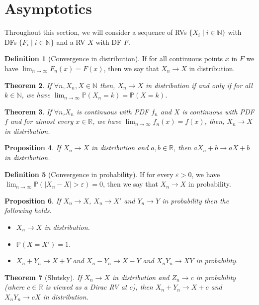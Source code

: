 \documentclass[paper=a4, fontsize=12pt]{scrartcl} %
\newtheorem{thm}{Theorem}[section]
\newtheorem{prop}[thm]{Proposition}
\theoremstyle{definition}
\newtheorem{defn}[thm]{Definition}
\theoremstyle{remark}
\newcommand{\R}{\mathbb{R}}
\newcommand{\N}{\mathbb{N}}
\renewcommand{\P}{\mathbb{P}}
\numberwithin{equation}{section} %
\numberwithin{figure}{section} %
\numberwithin{table}{section} %
\begin{document}
\section{Asymptotics}
Throughout this section, we will consider a sequence of RVs $\{X_i \mid i \in \N\}$ with DFs $\{F_i \mid i \in \N\}$ and a RV $X$ with DF $F$.
\begin{defn}[Convergence in distribution]
	If for all continuous points $x$ in $F$ we have $\lim_{n\rightarrow \infty} F_n(x) = F(x)$, then we say that $X_n \rightarrow X$ in distribution.
\end{defn}
\begin{thm}
	If $\forall n, X_n,X \in \N$ then, $X_n \rightarrow X$ in distribution if and only if for all $k \in \N$, we have $\lim_{n\rightarrow \infty} \P(X_n = k) = \P(X = k)$.
\end{thm}
\begin{thm}
	If $\forall n$,$X_n$ is continuous with PDF $f_n$ and $X$ is continuous with PDF $f$ and for almost every $x\in \R$, we have $\lim_{n\rightarrow \infty} f_n(x) = f(x)$, then, $X_n \rightarrow X$ in distribution.
\end{thm}
\begin{prop}
	If $X_n \rightarrow X$ in distribution and $a,b \in \R$, then $aX_n+b \rightarrow aX+b$ in distribution.
\end{prop}
\begin{defn}[Convergence in probability]
	If for every $\varepsilon > 0$, we have $\lim_{n\rightarrow \infty}\P(|X_n-X| > \varepsilon) = 0$, then we say that $X_n \rightarrow X$ in probability.
\end{defn}
\begin{prop}
	If $X_n \rightarrow X$, $X_n \rightarrow X'$ and $Y_n \rightarrow Y$ in probability then the following holds.
	\begin{itemize}
		\item $X_n \rightarrow X$ in distribution.
		\item $\P(X = X') = 1$.
		\item $X_n + Y_n \rightarrow X+Y$ and $X_n - Y_n \rightarrow X-Y$ and $X_nY_n \rightarrow XY$ in probability.
	\end{itemize}
\end{prop}
\begin{thm}[Slutsky]
	If $X_n \rightarrow X$ in distribution and $Z_n \rightarrow c$  in probability (where $c\in \R$ is viewed as a Dirac RV at $c$), then $X_n +Y_n \rightarrow X + c$ and $X_nY_n \rightarrow cX$ in distribution.
\end{thm}
\end{document}
